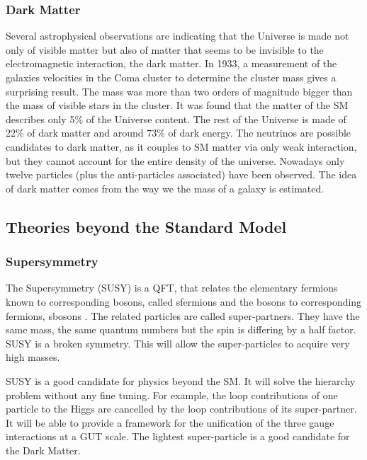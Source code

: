     \subsubsection{Dark Matter}
    
    Several astrophysical observations are indicating that the Universe is made not only of visible matter but also of matter that seems to be invisible to the electromagnetic interaction, the dark matter.
    In 1933, a measurement of the galaxies velocities in the Coma cluster to determine the cluster mass gives a surprising result.
    The mass was more than two orders of magnitude bigger than the mass of visible stars in the cluster.
    It was found that the matter of the \gls{SM} describes only 5\% of the Universe content. 
    The rest of the Universe is made of 22\% of dark matter and around 73\% of dark energy.
    The neutrinos are possible candidates to dark matter, as it couples to \gls{SM} matter via only weak interaction, but they cannot account for the entire density of the universe.
    Nowadays only twelve particles (plus the anti-particles associated) have been observed. 
    The idea of dark matter comes from the way we the mass of a galaxy is estimated.

    \subsection{Theories beyond the Standard Model}

      \subsubsection{Supersymmetry}
    
      The Supersymmetry (SUSY) is a QFT, that relates the elementary fermions known to corresponding bosons, called sfermions and the bosons to corresponding fermions, sbosons \cite{Signer2009}.
      The related particles are called super-partners.
      They have the same mass, the same quantum numbers but the spin is differing by a half factor.
      SUSY is a broken symmetry. 
      This will allow the super-particles to acquire very high masses.

      SUSY is a good candidate for physics beyond the \gls{SM}. 
      It will solve the hierarchy problem without any fine tuning.
      For example, the loop contributions of one particle to the Higgs are cancelled by the loop contributions of its super-partner.
      It will be able to provide a framework for the unification of the three gauge interactions at a GUT scale.
      The lightest super-particle is a good candidate for the Dark Matter.

